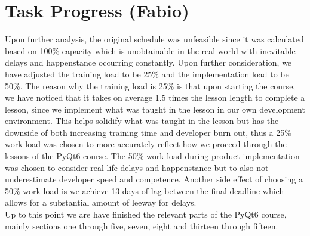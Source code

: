 \section{Task Progress (Fabio)}
Upon further analysis, the original schedule was unfeasible since it was calculated based on 100\% capacity which is unobtainable in the real world with inevitable delays and happenstance occurring constantly. Upon further consideration, we have adjusted the training load to be 25\% and the implementation load to be 50\%. The reason why the training load is 25\% is that upon starting the course, we have noticed that it takes on average 1.5 times the lesson length to complete a lesson, since we implement what was taught in the lesson in our own development environment. This helps solidify what was taught in the lesson but has the downside of both increasing training time and developer burn out, thus a 25\% work load was chosen to more accurately reflect how we proceed through the lessons of the PyQt6 course. The 50\% work load during product implementation was chosen to consider real life delays and happenstance but to also not underestimate developer speed and competence. Another side effect of choosing a 50\% work load is we achieve 13 days of lag between the final deadline which allows for a substantial amount of leeway for delays.\\
Up to this point we are have finished the relevant parts of the PyQt6 course, mainly sections one through five, seven, eight and thirteen through fifteen.